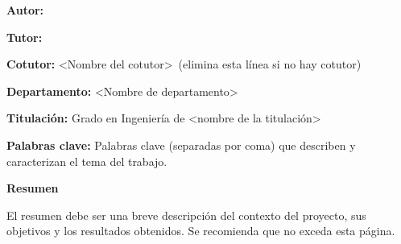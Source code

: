 
\pagestyle{fancy}
\renewcommand{\headrulewidth}{0pt}


\bigskip

\begin{center}
	\Large \scshape
	\textbf{\tfgtitlename}
\end{center}

\bigskip \bigskip \bigskip

\begin{minipage}{\textwidth}

\textbf{Autor:} \tfgauthorname

\medskip

\textbf{Tutor:} \tfgtutorname

\medskip

\textbf{Cotutor:} <Nombre del cotutor>\ (elimina esta línea si no hay cotutor)

\medskip

\textbf{Departamento:} <Nombre de departamento>

\medskip

\textbf{Titulación:} Grado en Ingeniería de <nombre de la titulación>

\medskip

\textbf{Palabras clave:} Palabras clave (separadas por coma) que describen y caracterizan el tema del trabajo.

\bigskip \bigskip


\end{minipage}

\begin{center}
	\textbf{Resumen}
\end{center}

El resumen debe ser una breve descripción del contexto del proyecto,
sus objetivos y los resultados obtenidos. Se recomienda que no exceda
esta página.

\blankpage